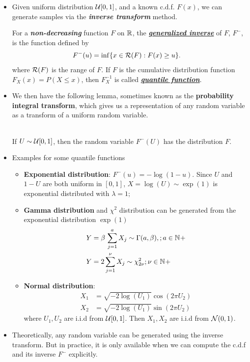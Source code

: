 \documentclass[11pt]{article}
\begin{document}
\begin{itemize}
\item Given uniform distribution ${\mathcal U}[0,1]$, and a known c.d.f. $F(x)$, we can generate samples via the \emph{\textbf{inverse transform}} method. \citep{robert1999monte}

\begin{definition}
For a \textbf{\emph{non-decreasing}} function $F$ on ${\mathbb R}$, the \underline{\emph{\textbf{generalized inverse}}} of $F$, $F^{-}$, is the function defined by
\begin{align}
F^{-}(u) &= \inf\{x \in {\mathcal R}(F): F(x) \ge u \}. \label{eqn: quantile_function}
\end{align} where ${\mathcal R}(F)$ is the range of $F$. If $F$ is the cumulative distribution function $F_{X}(x) = P(X \le x)$, then $F_{X}^{-1}$ is called \underline{\textbf{\emph{quantile function}}}.
\end{definition}

\item We then have the following lemma, sometimes known as the \textbf{probability integral transform}, which gives us a representation of any random variable as a transform of a uniform random variable.
\begin{lemma} \citep{robert1999monte}\\
If $U \sim {\mathcal U}[0,1]$, then the random variable $F^{-}(U)$ has the distribution $F$.
\end{lemma}

\item Examples for some quantile functions \citep{robert1999monte}
\begin{itemize}
\item \textbf{Exponential distribution}: $F^{-}(u) = -\log(1-u)$. Since $U$ and $1-U$ are both uniform in $[0,1]$, $X = \log(U)\sim \exp(1)$ is exponential distributed with $\lambda = 1$;
\item \textbf{Gamma distribution} and $\chi^2$ distribution can be generated from the exponential distribution $\exp(1)$
\begin{align*}
Y &= \beta\,\sum_{j=1}^{a}X_j \sim \Gamma(a, \beta),; a\in {\mathbb N}_{}+ \\
Y &= 2 \sum_{j=1}^{\nu} X_j \sim \chi^2_{2\nu} ; \nu\in {\mathbb N}_{}+
\end{align*}
\item \textbf{Normal distribution}:
\begin{align*}
X_1 &= \sqrt{-2\log(U_1)}\cos(2\pi U_2)\\
X_2 &= \sqrt{-2\log(U_1)}\sin(2\pi U_2)
\end{align*} where $U_1, U_2$ are i.i.d from ${\mathcal U}[0,1]$. Then $X_1, X_2$ are i.i.d from ${\mathcal N}(0,1)$.
\end{itemize}

\item Theoretically, any random variable can be generated using the inverse transform. But in practice, it is only available when we can compute the c.d.f and its inverse $F^{-}$ explicitly. 
\end{itemize}
\end{document}
